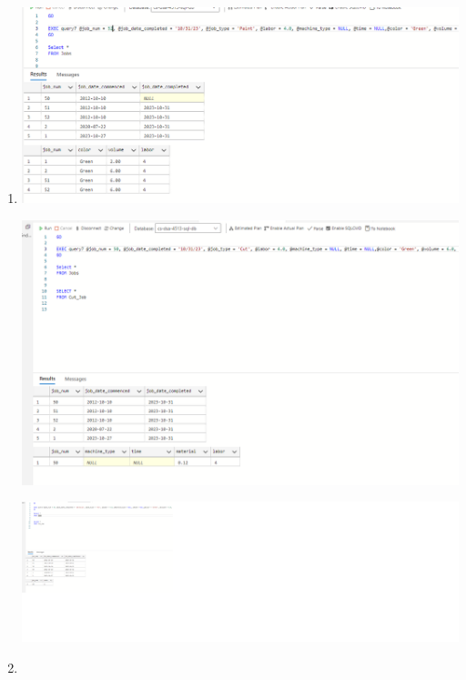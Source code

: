 \documentclass[11pt]{article}
\begin{document}
\begin{enumerate}
\item %

\includegraphics[width = \textwidth]{updateJobs1.png}

\includegraphics[width = \textwidth]{updateJobs2.png}

\includegraphics[width = \textwidth]{updateJobs3.png}

\item 


\end{enumerate}
\end{document}
